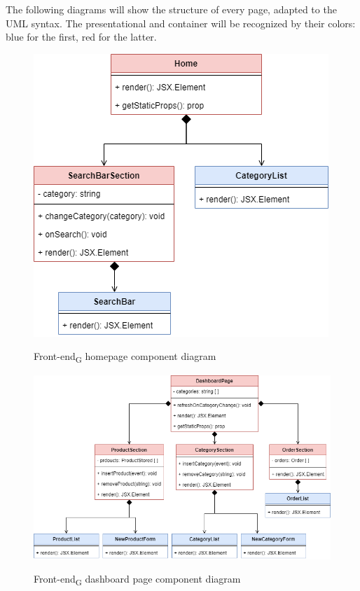 The following diagrams will show the structure of every page, adapted to the UML syntax. The presentational and container will be recognized by their colors: blue for the first, red for the latter. 

\begin{figure}[H]
\centering
\includegraphics[scale=0.50]{res/Architettura/Frontend/img/home}\\
\caption{Front-end\textsubscript{G} homepage component diagram}
\end{figure}

\begin{figure}[H]
\centering
\includegraphics[scale=0.50]{res/Architettura/Frontend/img/dashboard}\\
\caption{Front-end\textsubscript{G} dashboard page component diagram}
\end{figure}


